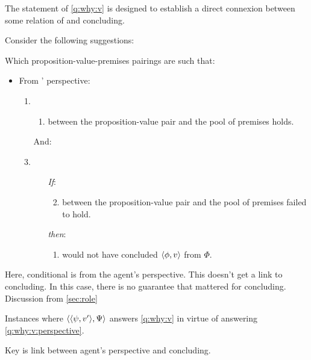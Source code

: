 \begin{note}
  The statement of \autoref{q:why:v} is designed to establish a direct connexion between some relation of \support{} and concluding.

  Consider the following suggestions:

  \begin{question}
    \label{q:why:v:perspective}
    Which proposition-value-premises pairings are such that:
    \begin{itemize}
    \item
      From \vAgent{}' perspective:
      \begin{enumerate}[label=]
      \item
        \begin{enumerate}[label=\alph*., ref=(\alph*)]
        \item
           between the proposition-value pair and the pool of premises holds.
        \end{enumerate}
      \item[And:]
      \item
        \begin{enumerate}
        \item[\emph{If}:]
          \begin{enumerate}[label=\alph*., ref=(\alph*), resume]
            \setcounter{enumiii}{1}
          \item
             between the proposition-value pair and the pool of premises failed to hold.
          \end{enumerate}
        \item[\emph{then}:]
          \begin{enumerate}[label=\alph*., ref=(\alph*), resume]
          \item \vAgent{} would not have concluded \(\langle \phi, v \rangle\) from \(\Phi\).
          \end{enumerate}
        \end{enumerate}
      \end{enumerate}
    \end{itemize}
  \end{question}

  Here, conditional is from the agent's perspective.
  This doesn't get a link to concluding.
  In this case, there is no guarantee that \support{} mattered for concluding.
  {
    \color{red}
    Discussion from \autoref{sec:role}
  }

  \begin{proposition}
    Instances where \(\langle \langle \psi, v' \rangle, \Psi \rangle\) answers \autoref{q:why:v} in virtue of answering \autoref{q:why:v:perspective}.
  \end{proposition}

  Key is link between agent's perspective and concluding.
\end{note}

